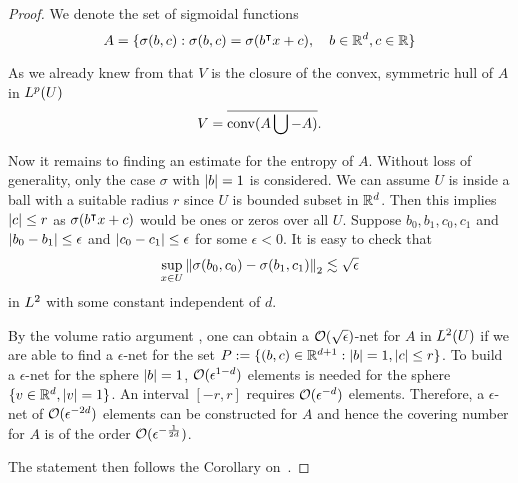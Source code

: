 \begin{proof}
    We denote the set of sigmoidal functions
    \begin{equation}
        A = \{\sigma(b,c): \sigma(b,c) = \sigma(b{}^{\intercal} x + c), \quad 
        b\in\mathbb{R}^d, c\in\mathbb{R}\}
    \end{equation}

    As we already knew from \cite{barronUniversalApproximationBounds1993} that
    $V$ is the closure of the convex, symmetric hull of $A$ in $L^{p}(U)$
    \begin{equation}
        V = \overline{\operatorname*{conv}(A \bigcup - A)}.
    \end{equation}
    
    Now it remains to finding an estimate for the entropy of $A$. Without loss
    of generality, only the case $\sigma$ with $\left| b \right| = 1$ is considered. We
    can assume $U$ is inside a ball with a suitable radius $r$ since $U$ is
    bounded subset in $\mathbb{R}^d$. Then this implies $\left| c \right| \leq r$ as $\sigma(b{}^{\intercal}
    x + c)$ would be ones or zeros over all $U$. Suppose $b_0, b_1, c_0, c_1$
    and $\left| b_0 - b_1 \right| \leq \epsilon$ and $\left| c_0 - c_1 \right| \leq \epsilon$ for
    some $\epsilon < 0$. It is easy to check that 
    \begin{equation}
        \sup_{x\in U} \left\| \sigma({b_0, c_0}) - \sigma({b_1, c_1}) \right\|_2
            \lesssim \sqrt{\epsilon}
    \end{equation}
    in $L^{2}$ with some constant independent of $d$.
    
    By the volume ratio argument \cite{vandervaartWeakConvergenceEmpirical1996},
    one can obtain a $\mathcal{O}(\sqrt{\epsilon})$-net for $A$ in $L^{2}(U)$ if we
    are able to find a $\epsilon$-net for the set $P:= \{(b,c)\in \mathbb{R}^{d+1}:
    \left| b \right| = 1, \left| c \right| \leq r\}$. To build a $\epsilon$-net for the sphere
    $\left| b \right|=1$, $\mathcal{O}(\epsilon^{1-d})$ elements is needed for the
    sphere $\{v \in \mathbb{R}^d, \left| v \right|=1\}$. An interval $[-r,r]$ requires
    $\mathcal{O}(\epsilon^{-d})$ elements. Therefore, a $\epsilon$-net of
    $\mathcal{O}(\epsilon^{-2d})$ elements can be constructed for $A$ and hence the
    covering number for $A$ is of the order $\mathcal{O}(\epsilon^{-\frac{1}{2d}})$.

    The statement then follows the Corollary on~\cite[p.
    104]{makovozRandomApproximantsNeural1996}.



\end{proof}
